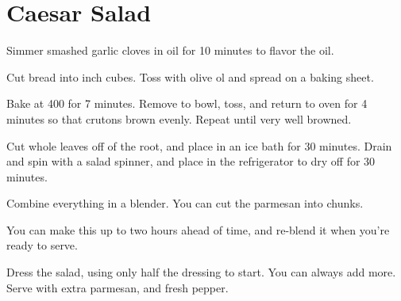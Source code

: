 \section{Caesar Salad}
\begin{recipe}



Simmer smashed garlic cloves in oil for 10 minutes to flavor the oil.

Cut bread into  inch cubes. Toss with olive ol and spread on a baking sheet.

Bake at 400\degree{} for 7 minutes. Remove to bowl, toss, and return to oven for 4 minutes so that crutons brown evenly. Repeat until very well browned. 


Cut whole leaves off of the root, and place in an ice bath for 30 minutes. Drain and spin with a salad spinner, and place in the refrigerator to dry off for 30 minutes.


Combine everything in a blender. You can cut the parmesan into chunks. 

You can make this up to two hours ahead of time, and re-blend it when you're ready to serve. 

Dress the salad, using only half the dressing to start. You can always add more. Serve with extra parmesan, and fresh pepper. 

\end{recipe}
